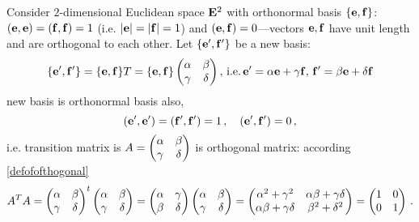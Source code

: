 \documentclass[12pt]{article}
\numberwithin{equation}{section}
\begin{document}
 Consider $2$-dimensional Euclidean space ${\bf E}^2$ with orthonormal basis $\{{\bf e},{\bf f}\}$:
 $({\bf e},{\bf e})=({\bf f},{\bf f})=1$ (i.e. $|{\bf e}|=|{\bf f}|=1$) and $({\bf e},{\bf f})=0$---vectors ${\bf e},{\bf f}$ have unit length and are orthogonal to each other.
Let  $\{{\bf e}',{\bf f}'\}$ be a new basis:
             $$
    \{{\bf e}',{\bf f}'\}=\{{\bf e},{\bf f}\}T=  \{{\bf e},{\bf f}\}
   \begin{pmatrix}
      \alpha & \beta \\
      \gamma & \delta\\
       \end{pmatrix},
\, {\rm i.e.}\,{\bf e}'=\alpha {\bf e}+\gamma {\bf f},\, {\bf f}'=\beta {\bf e}+\delta {\bf f}
                $$
new basis is orthonormal basis also,
             $$
({\bf e}',{\bf e}')=({\bf f}',{\bf f}')=1\,,\quad ({\bf e}',{\bf f}')=0\,,
             $$
i.e. transition matrix is $A=\begin{pmatrix}
      \alpha & \beta \\
      \gamma & \delta\\
       \end{pmatrix}$ is orthogonal matrix: according \eqref{defofofthogonal}
\begin{equation*}\label{conditionfortransitionmatrix1}
          A^TA=\begin{pmatrix}
      \alpha & \beta \\
      \gamma & \delta\\
       \end{pmatrix}^t
       \begin{pmatrix}
      \alpha & \beta \\
      \gamma & \delta\\
       \end{pmatrix}=
       \begin{pmatrix}
      \alpha & \gamma \\
      \beta & \delta\\
       \end{pmatrix}
       \begin{pmatrix}
      \alpha & \beta \\
      \gamma & \delta\\
       \end{pmatrix}=
       \begin{pmatrix}
      \alpha^2+\gamma^2 & \alpha\beta+\gamma\delta \\
      \alpha\beta+\gamma\delta & \beta^2+\delta^2\\
       \end{pmatrix}=
       \begin{pmatrix}
      1 & 0 \\
      0& 1\\
       \end{pmatrix}\,.
\end{equation*}
\end{document}
